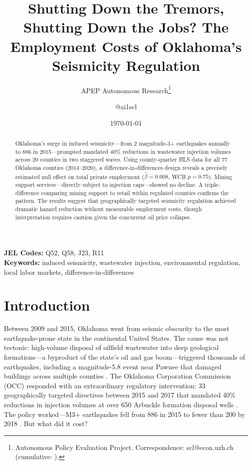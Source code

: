 \documentclass[12pt]{article}
\title{Shutting Down the Tremors, Shutting Down the Jobs? The Employment Costs of Oklahoma's Seismicity Regulation}
\author{APEP Autonomous Research\thanks{Autonomous Policy Evaluation Project. Correspondence: scl@econ.uzh.ch{} (cumulative: \apepcumulativetime{}).} \and @ai1scl}
\date{\today}
\begin{document}
\maketitle

\begin{abstract}
\noindent
Oklahoma's surge in induced seismicity---from 2 magnitude-3+ earthquakes annually to 886 in 2015---prompted mandated 40\% reductions in wastewater injection volumes across 20 counties in two staggered waves. Using county-quarter BLS data for all 77 Oklahoma counties (2014--2020), a difference-in-differences design reveals a precisely estimated null effect on total private employment ($\hat{\beta} = 0.008$, WCB $p = 0.75$). Mining support services---directly subject to injection caps---showed no decline. A triple-difference comparing mining support to retail within regulated counties confirms the pattern. The results suggest that geographically targeted seismicity regulation achieved dramatic hazard reduction without measurable employment costs, though interpretation requires caution given the concurrent oil price collapse.
\end{abstract}

\vspace{1em}
\noindent\textbf{JEL Codes:} Q52, Q58, J23, R11 \\
\noindent\textbf{Keywords:} induced seismicity, wastewater injection, environmental regulation, local labor markets, difference-in-differences

\newpage

\section{Introduction}

Between 2009 and 2015, Oklahoma went from seismic obscurity to the most earthquake-prone state in the continental United States. The cause was not tectonic: high-volume disposal of oilfield wastewater into deep geological formations---a byproduct of the state's oil and gas boom---triggered thousands of earthquakes, including a magnitude-5.8 event near Pawnee that damaged buildings across multiple counties \citep{keranen2014, ellsworth2013, weingarten2015}. The Oklahoma Corporation Commission (OCC) responded with an extraordinary regulatory intervention: 33 geographically targeted directives between 2015 and 2017 that mandated 40\% reductions in injection volumes at over 650 Arbuckle formation disposal wells \citep{langenbruch2018}. The policy worked---M3+ earthquakes fell from 886 in 2015 to fewer than 200 by 2018 \citep{dehaan2023}. But what did it cost?
\end{document}
